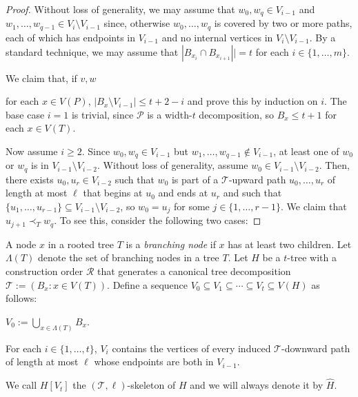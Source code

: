 \documentclass[kpfonts]{patmorin}
\theoremstyle{named}
\begin{document}
\begin{proof}
    Without loss of generality, we may assume that $w_0,w_q\in V_{i-1}$ and $w_1,\ldots,w_{q-1}\in V_i\setminus V_{i-1}$ since, otherwise $w_0,\ldots,w_q$ is covered by two or more paths, each of which has endpoints in $V_{i-1}$ and no internal vertices in $V_i\setminus V_{i-1}$.  By a standard technique, we may assume that $|B_{x_i}\cap B_{x_{i+1}}||=t$ for each $i\in\{1,\ldots,m\}$.

    We claim that, if $v, w$


    for each $x\in V(P)$, $|B_{x}\setminus V_{i-1}|\le t+2-i$ and prove this by induction on $i$.  The base case $i=1$ is trivial, since $\mathcal{P}$ is a width-$t$ decomposition, so $B_x\le t+1$ for each $x\in V(T)$.

    Now assume $i\ge 2$.  Since $w_0,w_q\in V_{i-1}$ but $w_1,\ldots,w_{q-1}\not\in V_{i-1}$, at least one of $w_0$ or $w_q$ is in $V_{i-1}\setminus V_{i-2}$.  Without loss of generality, assume $w_0\in V_{i-1}\setminus V_{i-2}$.  Then, there exists $u_0,u_r\in V_{i-2}$ such that $w_0$ is part of a $\mathcal{T}$-upward path $u_0,\ldots,u_r$ of length at most $\ell$ that begins at $u_0$ and ends at $u_r$ and such that $\{u_1,\ldots,u_{r-1}\}\subseteq V_{i-1}\setminus V_{i-2}$, so $w_0=u_j$ for some $j\in\{1,\ldots,r-1\}$.  We claim that $u_{j+1}\prec_T w_q$.  To see this, consider the following two cases:
\end{proof}



A node $x$ in a rooted tree $T$ is a \emph{branching node} if $x$ has at least two children.  Let $\Lambda(T)$ denote the set of branching nodes in a tree $T$.  Let $H$ be a $t$-tree with a construction order $\mathcal{R}$ that generates a canonical tree decomposition $\mathcal{T}:=(B_x:x\in V(T))$.  Define a sequence $V_0\subseteq V_1\subseteq\cdots\subseteq V_t\subseteq V(H)$ as follows:
\begin{compactenum}[(V1)]
    \item $V_0:=\bigcup_{x\in\Lambda(T)} B_x$.

    \item\label{v-def-paths} For each $i\in\{1,\ldots,t\}$, $V_i$ contains the vertices of every induced $\mathcal{T}$-downward path of length at most $\ell$ whose endpoints are both in $V_{i-1}$.
\end{compactenum}
We call $H[V_t]$ the $(\mathcal{T},\ell)$-skeleton of $H$ and we will always denote it by $\hat{H}$.
\end{document}
